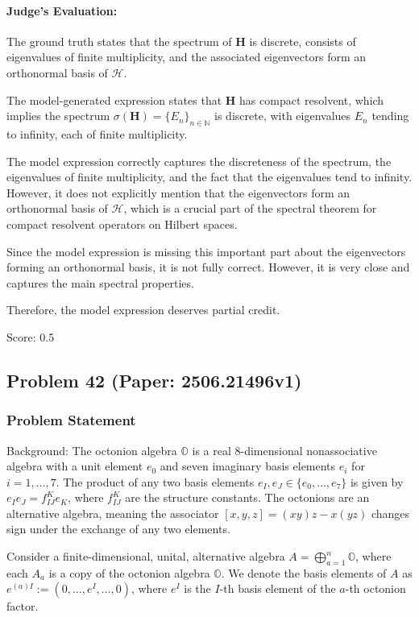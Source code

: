 \documentclass[10pt]{article}
\begin{document}
\paragraph*{Judge's Evaluation:}

The ground truth states that the spectrum of \(\mathbf{H}\) is discrete, consists of eigenvalues of finite multiplicity, and the associated eigenvectors form an orthonormal basis of \(\mathcal{H}\).

The model-generated expression states that \(\mathbf{H}\) has compact resolvent, which implies the spectrum \(\sigma(\mathbf{H}) = \{E_n\}_{n \in \mathbb{N}}\) is discrete, with eigenvalues \(E_n\) tending to infinity, each of finite multiplicity.

The model expression correctly captures the discreteness of the spectrum, the eigenvalues of finite multiplicity, and the fact that the eigenvalues tend to infinity. However, it does not explicitly mention that the eigenvectors form an orthonormal basis of \(\mathcal{H}\), which is a crucial part of the spectral theorem for compact resolvent operators on Hilbert spaces.

Since the model expression is missing this important part about the eigenvectors forming an orthonormal basis, it is not fully correct. However, it is very close and captures the main spectral properties.

Therefore, the model expression deserves partial credit.

Score: 0.5

\newpage
\subsection*{Problem 42 (Paper: 2506.21496v1)}
\subsubsection*{Problem Statement}
Background:
The octonion algebra $\mathbb{O}$ is a real 8-dimensional nonassociative algebra with a unit element $e_0$ and seven imaginary basis elements $e_i$ for $i=1,\dots,7$. The product of any two basis elements $e_I, e_J \in \{e_0, \dots, e_7\}$ is given by $e_I e_J = f^K_{IJ} e_K$, where $f^K_{IJ}$ are the structure constants. The octonions are an alternative algebra, meaning the associator $[x,y,z] = (xy)z - x(yz)$ changes sign under the exchange of any two elements.

Consider a finite-dimensional, unital, alternative algebra $A = \bigoplus_{a=1}^n \mathbb{O}$, where each $A_a$ is a copy of the octonion algebra $\mathbb{O}$. We denote the basis elements of $A$ as $e^{(a)I} := (0, \dots, e^I, \dots, 0)$, where $e^I$ is the $I$-th basis element of the $a$-th octonion factor.
\end{document}
